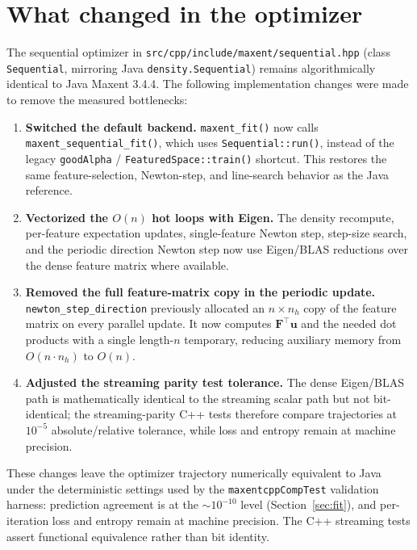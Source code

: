 \section{What changed in the optimizer}
\label{sec:hotpaths}

The sequential optimizer in
\texttt{src/cpp/include/maxent/sequential.hpp} (class
\texttt{Sequential}, mirroring Java \texttt{density.Sequential})
remains algorithmically identical to Java Maxent 3.4.4.  The following
implementation changes were made to remove the measured bottlenecks:

\begin{enumerate}[leftmargin=1.2em]
\item \textbf{Switched the default backend.} \texttt{maxent\_fit()} now
calls \texttt{maxent\_sequential\_fit()}, which uses \texttt{Sequential::run()},
instead of the legacy \texttt{goodAlpha} / \texttt{FeaturedSpace::train()}
shortcut.  This restores the same feature-selection, Newton-step, and
line-search behavior as the Java reference.
\item \textbf{Vectorized the $O(n)$ hot loops with Eigen.} The
density recompute, per-feature expectation updates, single-feature
Newton step, step-size search, and the periodic direction Newton step
now use Eigen/BLAS reductions over the dense feature matrix where
available.
\item \textbf{Removed the full feature-matrix copy in the periodic
update.} \texttt{newton\_step\_direction} previously allocated an
$n \times n_h$ copy of the feature matrix on every parallel update.
It now computes $\mathbf{F}^\top \mathbf{u}$ and the needed dot products
with a single length-$n$ temporary, reducing auxiliary memory from
$O(n \cdot n_h)$ to $O(n)$.
\item \textbf{Adjusted the streaming parity test tolerance.} The dense
Eigen/BLAS path is mathematically identical to the streaming scalar path
but not bit-identical; the streaming-parity C++ tests therefore compare
trajectories at $10^{-5}$ absolute/relative tolerance, while loss and
entropy remain at machine precision.
\end{enumerate}

These changes leave the optimizer trajectory numerically equivalent to
Java under the deterministic settings used by the
\texttt{maxentcppCompTest} validation harness: prediction agreement is
at the $\sim 10^{-10}$ level (Section~\ref{sec:fit}), and per-iteration
loss and entropy remain at machine precision.  The C++ streaming tests
assert functional equivalence rather than bit identity.

